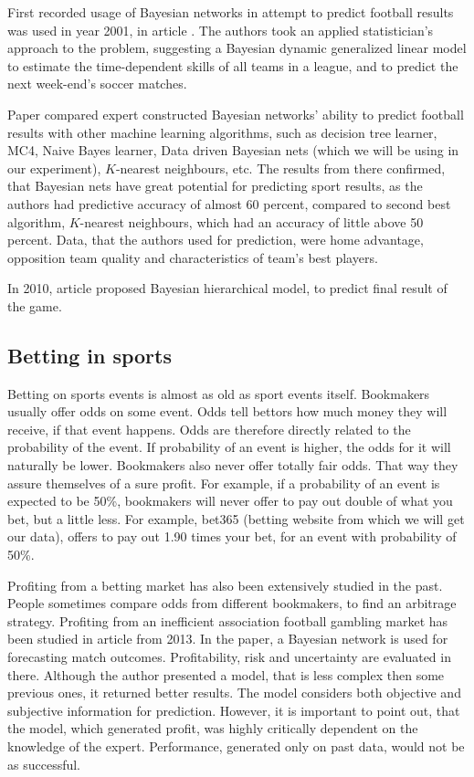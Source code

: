 \documentclass[conference]{IEEEtran}
\begin{document}
First recorded usage of Bayesian networks in attempt to predict football results was used in
year 2001, in article \cite{Rue_2001}. The authors took an applied statistician's approach to the problem, 
suggesting a Bayesian dynamic generalized linear model to estimate the time-dependent 
skills of all teams in a league, and to predict the next week-end's soccer matches.

Paper \cite{Joseph_2006} compared expert constructed Bayesian networks' ability to predict football 
results with other machine learning algorithms, such as decision tree learner, MC4, Naive Bayes learner,
Data driven Bayesian nets (which we will be using in our experiment), $K$-nearest neighbours, etc. 
The results from there confirmed, that Bayesian nets have great potential for predicting sport
results, as the authors had predictive accuracy of almost 60 percent, compared to second best
algorithm, $K$-nearest neighbours, which had an accuracy of little above 50 percent. Data, that the authors 
used for prediction, were home advantage, opposition team quality and characteristics of team's best players.


In 2010, article \cite{Baio_2010} proposed Bayesian hierarchical model, to predict final result 
of the game.

\subsection{Betting in sports}

Betting on sports events is almost as old as sport events itself. Bookmakers usually offer odds on 
some event. Odds tell bettors how much money they will receive, if that event happens. Odds are therefore 
directly related to the probability of the event. If probability of an event is higher, the odds for it will
naturally be lower. Bookmakers also never offer totally fair odds. That way they assure themselves of a sure
profit. For example, if a probability of an event is expected to be 50\%, bookmakers will never offer to pay 
out double of what you bet, but a little less. For example, bet365 (betting website from which we will get our
data), offers to pay out 1.90 times your bet, for an event with probability of 50\%. 

Profiting from a betting market has also been extensively studied in the past. People sometimes compare odds from
different bookmakers, to find an arbitrage strategy. Profiting from an inefficient association football gambling
market has been studied in article \cite{Constantinou_2013} from 2013. In the paper, a Bayesian network is used
for forecasting match outcomes. Profitability, risk and uncertainty are evaluated in there. Although the author
presented a model, that is less complex then some previous ones, it returned better results. The model considers
both objective and subjective information for prediction.  However, it is important to point out, that the model,
which generated profit, was highly critically dependent on the knowledge of the expert. Performance, generated 
only on past data, would not be as successful.
\end{document}
